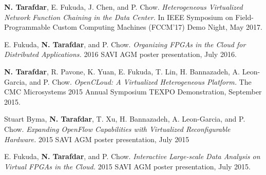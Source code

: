 \onecol
{
    \textbf{N. Tarafdar}, E. Fukuda, J. Chen, and P. Chow.
    \textit{Heterogeneous Virtualized Network Function Chaining in the Data Center.}
    In IEEE Symposium on Field-Programmable Custom Computing Machines (FCCM'17) Demo Night, May 2017. 
}

\onecol
{
    E. Fukuda, \textbf{N. Tarafdar}, and P. Chow.
    \textit{Organizing FPGAs in the Cloud for Distributed Applications.}
    2016 SAVI AGM poster presentation, July 2016. 
}


\onecol
{
    \textbf{N. Tarafdar}, R. Pavone, K. Yuan, E. Fukuda, T. Lin, H. Bannazadeh, A. Leon-Garcia, and P. Chow. 
    \textit{OpenCLoud: A Virtualized Heterogeneous Platform.} 
    The CMC Microsystems 2015 Annual Symposium TEXPO Demonstration, September 2015. 
}

\onecol
{
    Stuart Byma, \textbf{N. Tarafdar}, T. Xu, H. Bannazadeh, A. Leon-Garcia, and P. Chow.
    \textit{Expanding OpenFlow Capabilities with Virtualized Reconfigurable Hardware.}
    2015 SAVI AGM poster presentation, July 2015
}


\onecol
{
    E. Fukuda, \textbf{N. Tarafdar}, and P. Chow.
    \textit{Interactive Large-scale Data Analysis on Virtual FPGAs in the Cloud.}
    2015 SAVI AGM poster presentation, July 2015. 

}


